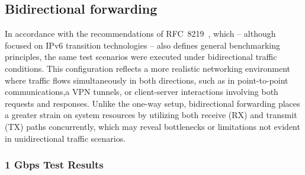 \subsection{Bidirectional forwarding}

In accordance with the recommendations of RFC~8219~\cite{RFC8219}, which -- although focused on IPv6 transition technologies -- 
also defines general benchmarking principles, the same test scenarios were executed under bidirectional traffic conditions.  
This configuration reflects a more realistic networking environment where traffic flows simultaneously in both directions, such as in point-to-point communications,a
 VPN tunnels, or client-server interactions involving both requests and responses.  
Unlike the one-way setup, bidirectional forwarding places a greater strain on system resources by utilizing both receive (RX) and transmit (TX) paths concurrently, 
which may reveal bottlenecks or limitations not evident in unidirectional traffic scenarios.

\subsubsection{1 Gbps Test Results}


